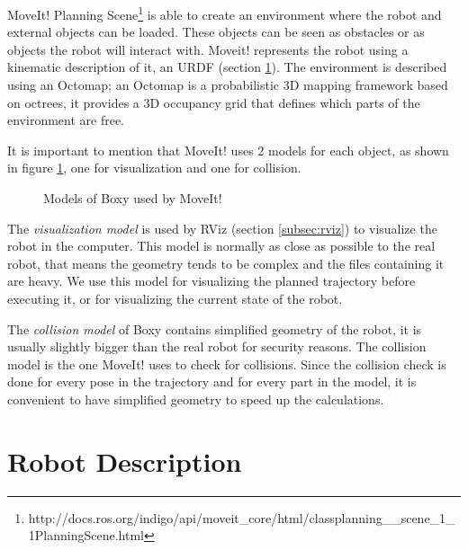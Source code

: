 MoveIt! Planning Scene\footnote{http://docs.ros.org/indigo/api/moveit\_core/html/classplanning\_\_scene\_1\_1PlanningScene.html} is able to create an environment where the robot and external objects can be loaded. These objects can be seen as obstacles or as objects the robot will interact with. Moveit! represents the robot using a kinematic description of it, an URDF (section \ref{sec:urdf}). The environment is described using an Octomap; an Octomap is a probabilistic 3D mapping framework based on octrees, it provides a 3D occupancy grid that defines which parts of the environment are free.

It is important to mention that MoveIt! uses 2 models for each object, as shown in figure \ref{fig:models}, one for visualization and one for collision. 
\begin{figure}[H]
	\centering
	\begin{subfigure}[][Visualization Model]
		{\texttt{[image: boxy/visual.png]}}
	\end{subfigure}
	\begin{subfigure}[][Collision Model]
		{\texttt{[image: boxy/collision.png]}}
	\end{subfigure}
	\vspace{-15pt}
	\caption{Models of Boxy used by MoveIt!}
	\vspace{-10pt}
	\label{fig:models}
\end{figure}

The \textit{visualization model} is used by RViz (section \ref{subsec:rviz}) to visualize the robot in the computer. This model is normally as close as possible to the real robot, that means the geometry tends to be complex and the files containing it are heavy. We use this model for visualizing the planned trajectory before executing it, or for visualizing the current state of the robot.

The \textit{collision model} of Boxy contains simplified geometry of the robot, it is usually slightly bigger than the real robot for security reasons. The collision model is the one MoveIt! uses to check for collisions. Since the collision check is done for every pose in the trajectory and for every part in the model, it is convenient to have simplified geometry to speed up the calculations. 

\section{Robot Description}
\label{sec:urdf}


